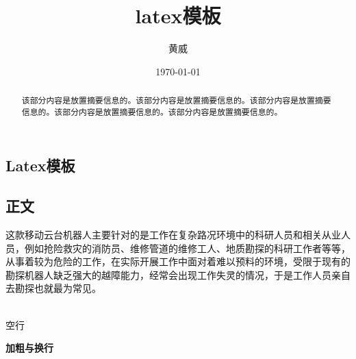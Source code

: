 \documentclass[12pt]{article}
\begin{document}
\begin{CJK}{UTF8}{gbsn}        %
 \pagestyle{fancy}
 \lhead{}                         %
 \chead{}                         %
 \lfoot{}                       
 \rfoot{\thepage} 
 \renewcommand{\headrulewidth}{0.4pt}
 \renewcommand{\footrulewidth}{0.4pt}
\author{黄威}
\title{latex模板}              
\date{\today}
\maketitle                         %
\begin{abstract}
该部分内容是放置摘要信息的。该部分内容是放置摘要信息的。该部分内容是放置摘要信息的。该部分内容是放置摘要信息的。该部分内容是放置摘要信息的。
\end{abstract}

\renewcommand{\contentsname}{目录} %
\tableofcontents                  %
\newpage


\section{Latex模板}


\subsection{正文}
\label{sec:fastguide}
这款移动云台机器人主要针对的是工作在复杂路况环境中的科研人员和相关从业人员，例如抢险救灾的消防员、维修管道的维修工人、地质勘探的科研工作者等等，从事着较为危险的工作，在实际开展工作中面对着难以预料的环境，受限于现有的勘探机器人缺乏强大的越障能力，经常会出现工作失灵的情况，于是工作人员亲自去勘探也就最为常见。\par
~\\                                      %
空行\par
\textbf{加粗与换行}


\end{CJK}
\end{document}
